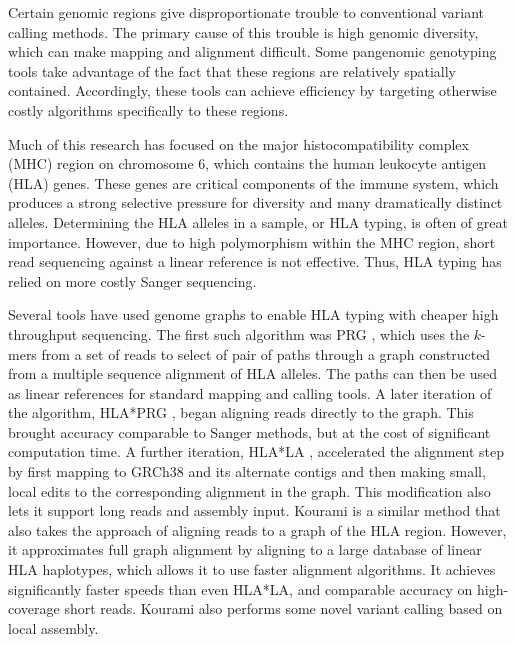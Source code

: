 Certain genomic regions give disproportionate trouble to conventional variant calling methods. 
The primary cause of this trouble is high genomic diversity, which can make mapping and alignment difficult. 
Some pangenomic genotyping tools take advantage of the fact that these regions are relatively spatially contained. 
Accordingly, these tools can achieve efficiency by targeting otherwise costly algorithms specifically to these regions.

Much of this research has focused on the major histocompatibility complex (MHC) region on chromosome 6, which contains the human leukocyte antigen (HLA) genes. 
These genes are critical components of the immune system, which produces a strong selective pressure for diversity and many dramatically distinct alleles.
Determining the HLA alleles in a sample, or HLA typing, is often of great importance. 
However, due to high polymorphism within the MHC region, short read sequencing against a linear reference is not effective.
Thus, HLA typing has relied on more costly Sanger sequencing.

Several tools have used genome graphs to enable HLA typing with cheaper high throughput sequencing.
The first such algorithm was PRG \cite{dilthey2015improved}, which uses the $k$-mers from a set of reads to select of pair of paths through a graph constructed from a multiple sequence alignment of HLA alleles.
The paths can then be used as linear references for standard mapping and calling tools.
A later iteration of the algorithm, HLA*PRG \cite{dilthey2018hla}, began aligning reads directly to the graph.
This brought accuracy comparable to Sanger methods, but at the cost of significant computation time.
A further iteration, HLA*LA \cite{dilthey2019hla}, accelerated the alignment step by first mapping to GRCh38 and its alternate contigs and then making small, local edits to the corresponding alignment in the graph.
This modification also lets it support long reads and assembly input.
Kourami \cite{lee2018kourami} is a similar method that also takes the approach of aligning reads to a graph of the HLA region.
However, it approximates full graph alignment by aligning to a large database of linear HLA haplotypes, which allows it to use faster alignment algorithms.
It achieves significantly faster speeds than even HLA*LA, and comparable accuracy on high-coverage short reads.
Kourami also performs some novel variant calling based on local assembly.

